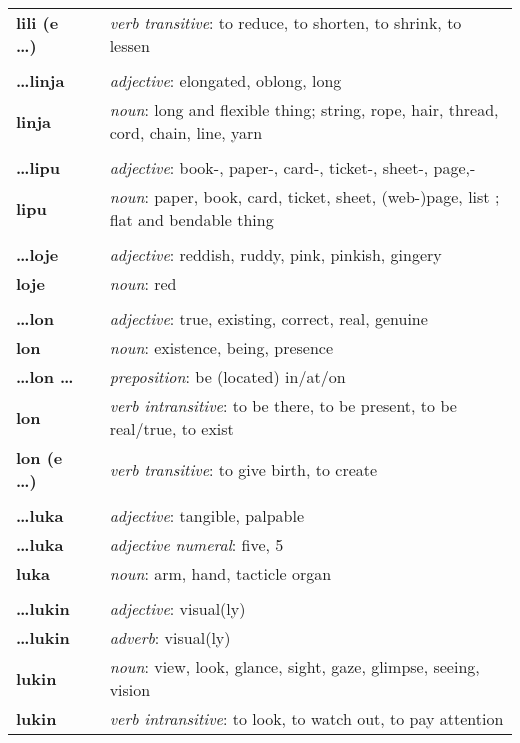 \begin{supertabular}{p{2,5cm}|ll}
\textbf{lili (e \dots)} && \textit{verb transitive}: to reduce, to shorten, to shrink, to lessen \\ 
 && \\ %
\textbf{\dots linja} && \textit{adjective}: elongated, oblong, long \\ 
\textbf{linja} && \textit{noun}: long and flexible thing; string, rope, hair, thread, cord, chain, line, yarn \\ 
 && \\ %
\textbf{\dots lipu} && \textit{adjective}: book-, paper-, card-, ticket-, sheet-, page,- \\ 
\textbf{lipu} && \textit{noun}: paper, book, card, ticket, sheet, (web-)page, list ; flat and bendable thing \\ 
 && \\ %
\textbf{\dots loje} && \textit{adjective}: reddish, ruddy, pink, pinkish, gingery \\ 
\textbf{loje} && \textit{noun}: red \\ 
 && \\ %
\textbf{\dots lon} && \textit{adjective}: true, existing, correct, real, genuine \\ 
\textbf{lon} && \textit{noun}: existence, being, presence \\ 
\textbf{\dots lon \dots} && \textit{preposition}: be (located) in/at/on \\ 
\textbf{lon} && \textit{verb intransitive}: to be there, to be present, to be real/true, to exist \\ 
\textbf{lon (e \dots)} && \textit{verb transitive}: to give birth, to create \\ 
 && \\ %
\textbf{\dots luka} && \textit{adjective}: tangible, palpable \\ 
\textbf{\dots luka} && \textit{adjective numeral}: five, 5 \\ 
\textbf{luka} && \textit{noun}: arm, hand, tacticle organ \\ 
 && \\ %
\textbf{\dots lukin} && \textit{adjective}: visual(ly) \\ 
\textbf{\dots lukin} && \textit{adverb}: visual(ly) \\ 
\textbf{lukin} && \textit{noun}: view, look, glance, sight, gaze, glimpse, seeing, vision \\ 
\textbf{lukin} && \textit{verb intransitive}: to look, to watch out, to pay attention \\ 

\end{supertabular}

